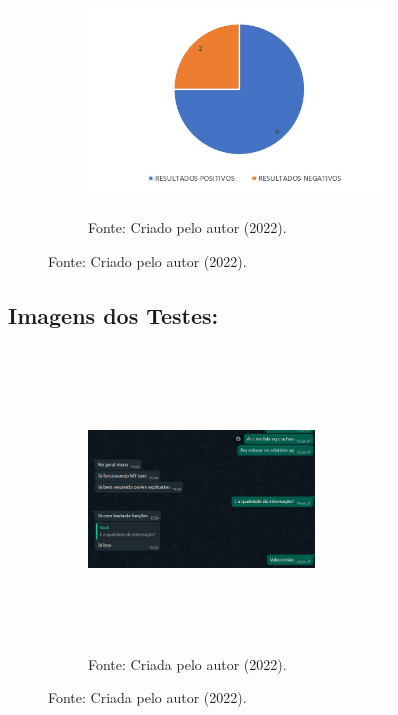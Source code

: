 \begin{itemize}
\begin{figure}[!htb]
\centering
\captionsetup[subfigure]{labelformat=empty}
\caption{``Gráfico Pizza''}
\begin{subfigure}{.5\textwidth}
\centering
\includegraphics[width=8cm,height=6cm]{Partes/Imagens/Pizza.jpeg}
\caption{Fonte: Criado pelo autor (2022).}
\end{subfigure}%
\end{figure}

\newpage

\subsection{Imagens dos Testes:}

\begin{figure}[!htb]
\centering
\captionsetup[subfigure]{labelformat=empty}
\caption{``Teste 1''}
\begin{subfigure}{.5\textwidth}
\centering
\includegraphics[width=6cm,height=8cm]{Partes/Imagens/teste 1.png}
\caption{Fonte: Criada pelo autor (2022).}
\end{subfigure}%
\end{figure}


\end{itemize}
